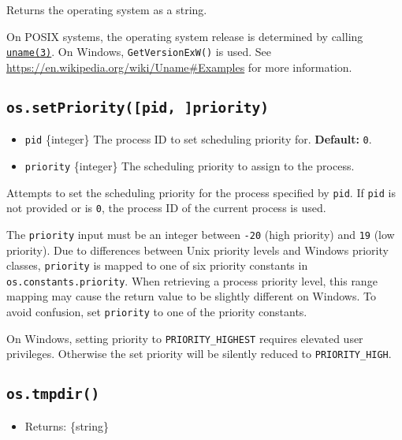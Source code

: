 Returns the operating system as a string.

On POSIX systems, the operating system release is determined by calling
\href{https://linux.die.net/man/3/uname}{\texttt{uname(3)}}. On Windows,
\texttt{GetVersionExW()} is used. See
\url{https://en.wikipedia.org/wiki/Uname\#Examples} for more
information.

\subsection{\texorpdfstring{\texttt{os.setPriority({[}pid,\ {]}priority)}}{os.setPriority({[}pid, {]}priority)}}\label{os.setprioritypid-priority}

\begin{itemize}
\tightlist
\item
  \texttt{pid} \{integer\} The process ID to set scheduling priority
  for. \textbf{Default:} \texttt{0}.
\item
  \texttt{priority} \{integer\} The scheduling priority to assign to the
  process.
\end{itemize}

Attempts to set the scheduling priority for the process specified by
\texttt{pid}. If \texttt{pid} is not provided or is \texttt{0}, the
process ID of the current process is used.

The \texttt{priority} input must be an integer between \texttt{-20}
(high priority) and \texttt{19} (low priority). Due to differences
between Unix priority levels and Windows priority classes,
\texttt{priority} is mapped to one of six priority constants in
\texttt{os.constants.priority}. When retrieving a process priority
level, this range mapping may cause the return value to be slightly
different on Windows. To avoid confusion, set \texttt{priority} to one
of the priority constants.

On Windows, setting priority to \texttt{PRIORITY\_HIGHEST} requires
elevated user privileges. Otherwise the set priority will be silently
reduced to \texttt{PRIORITY\_HIGH}.

\subsection{\texorpdfstring{\texttt{os.tmpdir()}}{os.tmpdir()}}\label{os.tmpdir}

\begin{itemize}
\tightlist
\item
  Returns: \{string\}
\end{itemize}

